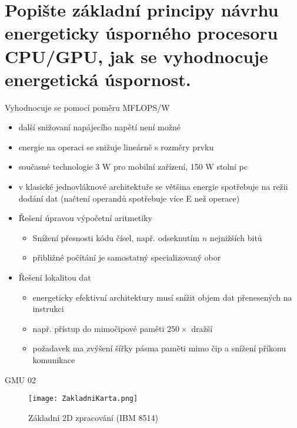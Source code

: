 




\newcommand\courseShortcut{GMU}
\newcommand\courseName{Grafické a multimediální procesory}
\newcommand\projectName{Příprava na zkoušku}




	


\section{Popište základní principy návrhu energeticky úsporného procesoru CPU/GPU, jak se vyhodnocuje energetická úspornost.}
	Vyhodnocuje se pomocí poměru MFLOPS/W
	
	\begin{itemize}
		\setlength\itemsep{0em}
		\item další snižovaní napájecího napětí není možné
		\item energie na operaci se snižuje lineárně s rozměry prvku
		\item současné technologie 3 W pro mobilní zařízení, 150 W stolní pc
		\item v klasické jednovláknové architektuře se většina energie spotřebuje na režii dodání dat (načtení operandů spotřebuje více E než operace)
		\item Řešení úpravou výpočetní aritmetiky
			\begin{itemize}
				\setlength\itemsep{0em}
				\item Snížení přesnosti kódu čísel, např. odseknutím $n$ nejnižších bitů
				\item přibližné počítání je samostatný specializovaný obor
			\end{itemize}			
		\item Řešení lokalitou dat
			\begin{itemize}
				\setlength\itemsep{0em}
				\item energeticky efektivní architektury musí snížit objem dat přenesených na instrukci
				\item např. přístup do mimočipové paměti $250\times$ dražší
				\item požadavek ma zvýšení šířky pásma paměti mimo čip a snížení příkonu komunikace
			\end{itemize}	
	\end{itemize}
	

	GMU 02
	\begin{figure}[h]
		\centering
		\texttt{[image: ZakladniKarta.png]}
		\caption{Základní 2D zpracování (IBM 8514)}
		\label{fig:ZakladniKarta}
	\end{figure}

